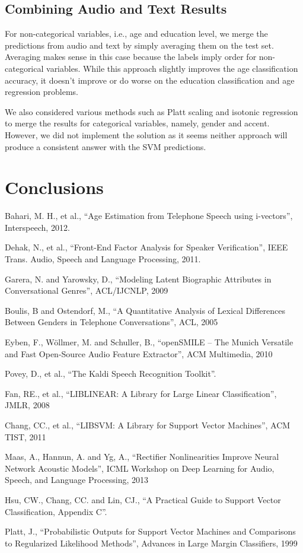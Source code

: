 \documentclass[a4paper]{article}
\begin{document}
\subsection{Combining Audio and Text Results}
For non-categorical variables, i.e., age and education level, we merge the predictions from audio and text by simply averaging them on the test set. Averaging makes sense in this case because the labels imply order for non-categorical variables. While this approach slightly improves the age classification accuracy, it doesn't improve or do worse on the education classification and age regression problems.

We also considered various methods such as Platt scaling \cite{platt} and isotonic regression to merge the results for categorical variables, namely, gender and accent. However, we did not implement the solution as it seems neither approach will produce a consistent answer with the SVM predictions. 

\section{Conclusions}


\eightpt

\begin{thebibliography}{10}
 Bahari, M. H., et al., 
``Age Estimation from Telephone Speech using i-vectors'', 
Interspeech, 2012.

 Dehak, N., et al., 
``Front-End Factor Analysis for Speaker Verification'', 
IEEE Trans. Audio, Speech and Language Processing, 2011.

 Garera, N. and Yarowsky, D.,
``Modeling Latent Biographic Attributes in Conversational Genres'',
ACL/IJCNLP, 2009

 Boulis, B and Ostendorf, M.,
``A Quantitative Analysis of Lexical Differences Between Genders in Telephone Conversations'',
ACL, 2005

 Eyben, F., Wöllmer, M. and Schuller, B.,
``openSMILE – The Munich Versatile and Fast Open-Source Audio Feature Extractor'',
ACM Multimedia, 2010

 Povey, D., et al.,
``The Kaldi Speech Recognition Toolkit''.

 Fan, RE., et al.,
``LIBLINEAR: A Library for Large Linear Classification'',
JMLR, 2008

 Chang, CC., et al.,
``LIBSVM: A Library for Support Vector Machines'',
ACM TIST, 2011

 Maas, A.,  Hannun, A. and Yg, A.,
``Rectifier Nonlinearities Improve Neural Network Acoustic Models'',
ICML Workshop on Deep Learning for Audio, Speech, and Language Processing, 2013

 Hsu, CW., Chang, CC. and Lin, CJ., 
``A Practical Guide to Support Vector Classification, Appendix C''.

 Platt, J.,
``Probabilistic Outputs for Support Vector Machines and Comparisons to Regularized Likelihood Methods'',
Advances in Large Margin Classifiers, 1999

\end{thebibliography}
\end{document}
